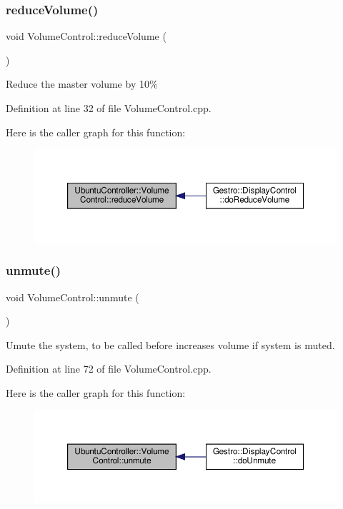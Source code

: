 \subsubsection{\texorpdfstring{reduce\+Volume()}{reduceVolume()}}
{\footnotesize\ttfamily void Volume\+Control\+::reduce\+Volume (\begin{DoxyParamCaption}{ }\end{DoxyParamCaption})}

Reduce the master volume by 10\% 

Definition at line 32 of file Volume\+Control.\+cpp.

Here is the caller graph for this function\+:
\nopagebreak
\begin{figure}[H]
\begin{center}
\leavevmode
\includegraphics[width=350pt]{class_ubuntu_controller_1_1_volume_control_ad8e3e3740268388e906984fa807761a1_icgraph}
\end{center}
\end{figure}
\mbox{\label{class_ubuntu_controller_1_1_volume_control_a4a541c510e22cd07b206ca80f979c1a1}} 
\subsubsection{\texorpdfstring{unmute()}{unmute()}}
{\footnotesize\ttfamily void Volume\+Control\+::unmute (\begin{DoxyParamCaption}{ }\end{DoxyParamCaption})}

Umute the system, to be called before increases volume if system is muted. 

Definition at line 72 of file Volume\+Control.\+cpp.

Here is the caller graph for this function\+:
\nopagebreak
\begin{figure}[H]
\begin{center}
\leavevmode
\includegraphics[width=350pt]{class_ubuntu_controller_1_1_volume_control_a4a541c510e22cd07b206ca80f979c1a1_icgraph}
\end{center}
\end{figure}


